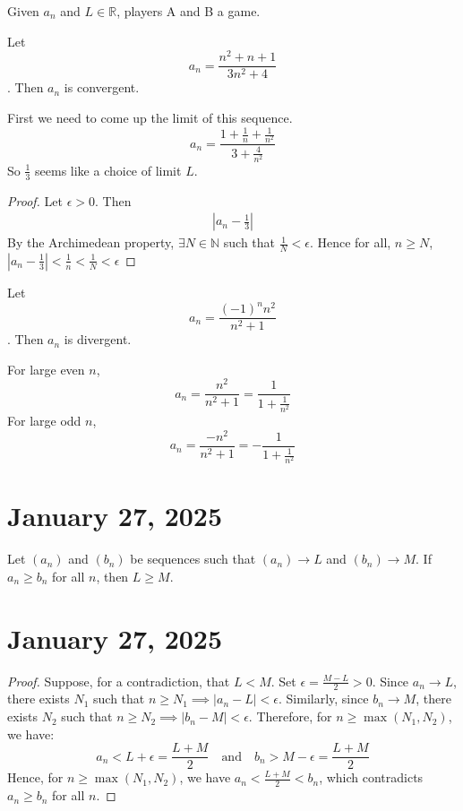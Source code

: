 \documentclass[11pt]{article}
\begin{document}
Given \(a_n\) and \(L \in \mathbb{R}\), players A and B a game. \\

\begin{example}
    Let \[a_n = \frac{n^2 + n + 1}{3n^2 + 4}\]. Then \(a_n\) is convergent.
\end{example}
First we need to come up the limit of this sequence. \\
\[a_n = \frac{1 + \frac{1}{n} + \frac{1}{n^2}}{3 + \frac{4}{n^2}}\]
So \(\frac{1}{3}\) seems like a choice of limit \(L\).
\begin{proof}
    Let \(\epsilon > 0\). Then
    \begin{align*}
        \left| a_n - \frac{1}{3} \right|
    \end{align*}
    By the Archimedean property, \(\exists N \in \mathbb{N}\) such that \(\frac{1}{N} < \epsilon\). Hence for all, \(n \geqslant N\), \(\left| a_n - \frac{1}{3} \right| < \frac{1}{n} < \frac{1}{N} < \epsilon\)
\end{proof}

\begin{example}
    Let \[a_n = \frac{(-1)^n n^2 }{n^2 + 1}\]. Then \(a_n\) is divergent.
\end{example}
For large even \(n\), \[a_n = \frac{n^2}{n^2 + 1} = \frac{1}{1 + \frac{1}{n^2}}\]
For large odd \(n\), \[a_n = \frac{-n^2}{n^2 + 1} = -\frac{1}{1 + \frac{1}{n^2}}\]

\section{January 27, 2025}
\begin{theorem}
    Let $(a_n)$ and $(b_n)$ be sequences such that $(a_n) \to L$ and $(b_n) \to M$. If $a_n \geq b_n$ for all $n$, then $L \geq M$.
\end{theorem}

\section{January 27, 2025}
\begin{proof}
    Suppose, for a contradiction, that $L < M$. Set $\epsilon = \frac{M - L}{2} > 0$. Since $a_n \to L$, there exists $N_1$ such that $n \geq N_1 \implies |a_n - L| < \epsilon$. Similarly, since $b_n \to M$, there exists $N_2$ such that $n \geq N_2 \implies |b_n - M| < \epsilon$. Therefore, for $n \geq \max(N_1, N_2)$, we have:
    \[
        a_n < L + \epsilon = \frac{L + M}{2} \quad \text{and} \quad b_n > M - \epsilon = \frac{L + M}{2}
    \]
    Hence, for $n \geq \max(N_1, N_2)$, we have $a_n < \frac{L + M}{2} < b_n$,
    which contradicts $a_n \geq b_n$ for all $n$.
\end{proof}
\end{document}

